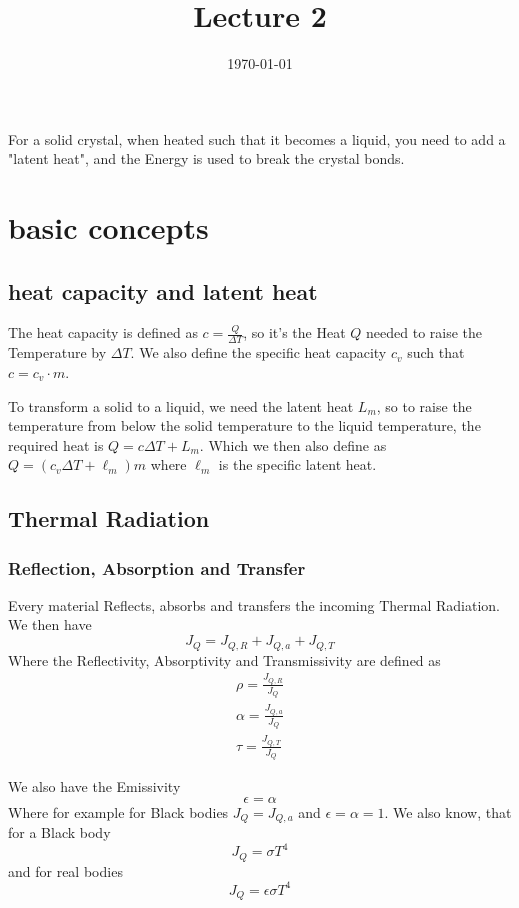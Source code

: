 \documentclass[]{scrartcl}
\title{Lecture 2}
\author{}
\date{\today}
\begin{document}
\maketitle
\newpage
\tableofcontents
\newpage

 
For a solid crystal, when heated such that it becomes a liquid, you need to add a "latent heat", and the Energy is used to break the crystal bonds.

\section{basic concepts}

\subsection{heat capacity and latent heat}

The heat capacity is defined as $c = \frac{Q}{\Delta T}$, so it's the Heat $Q$ needed to raise the Temperature by $\Delta T$. We also define the specific heat capacity $c_v$ such that $c = c_v\cdot m$.

To transform a solid to a liquid, we need the latent heat $L_m$, so to raise the temperature from below the solid temperature to the liquid temperature, the required heat is $Q = c\Delta T + L_m$. Which we then also define as $Q = (c_v\Delta T + \ell_m)m$ where $\ell_m$ is the specific latent heat.

\subsection{Thermal Radiation}
\subsubsection{Reflection, Absorption and Transfer}
Every material Reflects, absorbs and transfers the incoming Thermal Radiation. We then have
\begin{equation}
	J_Q = J_{Q,R} + J_{Q, a} + J_{Q, T}
\end{equation}
Where the Reflectivity, Absorptivity and Transmissivity are defined as
\begin{gather}
	\rho = \frac{J_{Q,R}}{J_Q}\\
	\alpha = \frac{J_{Q,a}}{J_Q}\\
	\tau = \frac{J_{Q,T}}{J_Q}
\end{gather}

We also have the Emissivity
\begin{equation}
	\epsilon = \alpha
\end{equation}
Where for example for Black bodies $J_Q = J_{Q,a}$ and $\epsilon = \alpha = 1$. We also know, that for a Black body
\begin{equation}
	J_Q = \sigma T^4
\end{equation}
and for real bodies
\begin{equation}
	J_Q = \epsilon\sigma T^4
\end{equation}
\end{document}
